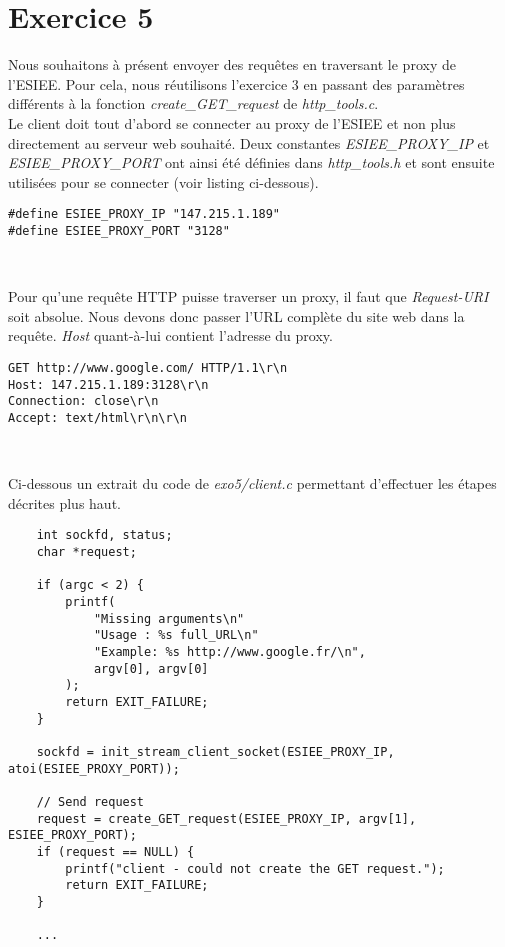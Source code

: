 \section{Exercice 5}
Nous souhaitons à présent envoyer des requêtes en traversant le proxy de l'ESIEE. Pour cela, nous réutilisons l'exercice 3 en passant des paramètres différents à la fonction \emph{create\_GET\_request} de \emph{http\_tools.c}.\\

Le client doit tout d'abord se connecter au proxy de l'ESIEE et non plus directement au serveur web souhaité. Deux constantes \emph{ESIEE\_PROXY\_IP} et \emph{ESIEE\_PROXY\_PORT} ont ainsi été définies dans \emph{http\_tools.h} et sont ensuite utilisées pour se connecter (voir listing ci-dessous).

\begin{lstlisting}[caption=Extrait de http\_tools.h]
#define ESIEE_PROXY_IP "147.215.1.189"
#define ESIEE_PROXY_PORT "3128"
\end{lstlisting}
\

Pour qu'une requête HTTP puisse traverser un proxy, il faut que \emph{Request-URI} soit absolue. Nous devons donc passer l'URL complète du site web dans la requête. \emph{Host} quant-à-lui contient l'adresse du proxy.

\begin{lstlisting}[caption=Exemple de requête en passant par le proxy de l'ESIEE]
GET http://www.google.com/ HTTP/1.1\r\n
Host: 147.215.1.189:3128\r\n
Connection: close\r\n
Accept: text/html\r\n\r\n
\end{lstlisting}
\

\noindent Ci-dessous un extrait du code de \emph{exo5/client.c} permettant d'effectuer les étapes décrites plus haut.

\begin{lstlisting}
    int sockfd, status;
    char *request;

    if (argc < 2) {
        printf(
            "Missing arguments\n"
            "Usage : %s full_URL\n"
            "Example: %s http://www.google.fr/\n",
            argv[0], argv[0]
        );
        return EXIT_FAILURE;
    }

    sockfd = init_stream_client_socket(ESIEE_PROXY_IP, atoi(ESIEE_PROXY_PORT));

    // Send request
    request = create_GET_request(ESIEE_PROXY_IP, argv[1], ESIEE_PROXY_PORT);
    if (request == NULL) {
        printf("client - could not create the GET request.");
        return EXIT_FAILURE;
    }

    ...
\end{lstlisting}

